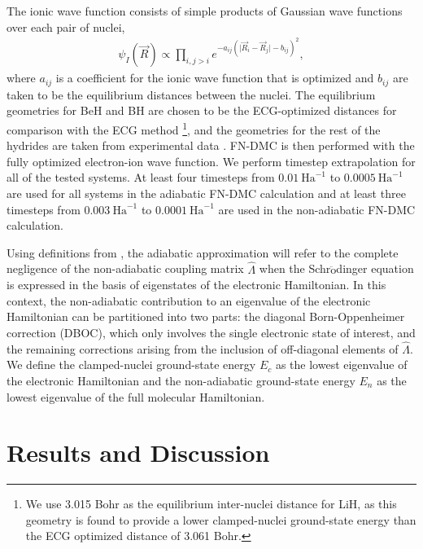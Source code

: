 \documentclass[pra,superscriptaddress,groupedaddress,twocolumn]{revtex4}
\begin{document}
The ionic wave function consists of simple products of Gaussian wave functions over each pair of nuclei,
\begin{align}
\psi_I(\vec{R})\propto \prod\limits_{i,j>i}e^{-a_{ij}(\vert \vec{R}_i-\vec{R}_j\vert-b_{ij})^2},
\label{wfs_ions}
\end{align}
where $a_{ij}$ is a coefficient for the ionic wave function that is optimized and $b_{ij}$ are taken to be the equilibrium distances between the nuclei. The equilibrium geometries for BeH and BH are chosen to be the ECG-optimized distances for comparison with the ECG method \footnote{We use 3.015 Bohr as the equilibrium inter-nuclei distance for LiH, as this geometry is found to provide a lower clamped-nuclei ground-state energy than the ECG optimized distance of 3.061 Bohr.}, and the geometries for the rest of the hydrides are taken from experimental data \cite{CCCBDB}. FN-DMC is then performed with the fully optimized electron-ion wave function. We perform timestep extrapolation for all of the tested systems. At least four timesteps from $0.01~\text{Ha}^{-1}$ to $0.0005~\text{Ha}^{-1}$ are used for all systems in the adiabatic FN-DMC calculation and at least three timesteps from $0.003~\text{Ha}^{-1}$ to $0.0001~\text{Ha}^{-1}$ are used in the non-adiabatic FN-DMC calculation.

Using definitions from \cite{Cederbaum_Review}, the adiabatic approximation will refer to the complete negligence of the non-adiabatic coupling matrix $\hat{\Lambda}$ when the Schr$\ddot{\text{o}}$dinger equation is expressed in the basis of eigenstates of the electronic Hamiltonian. In this context, the non-adiabatic contribution to an eigenvalue of the electronic Hamiltonian can be partitioned into two parts: the diagonal Born-Oppenheimer correction (DBOC), which only involves the single electronic state of interest, and the remaining corrections arising from the inclusion of off-diagonal elements of $\hat{\Lambda}$. We define the clamped-nuclei ground-state energy $E_c$ as the lowest eigenvalue of the electronic Hamiltonian and the non-adiabatic ground-state energy $E_n$ as the lowest eigenvalue of the full molecular Hamiltonian.

\section{Results and Discussion}


\end{document}
